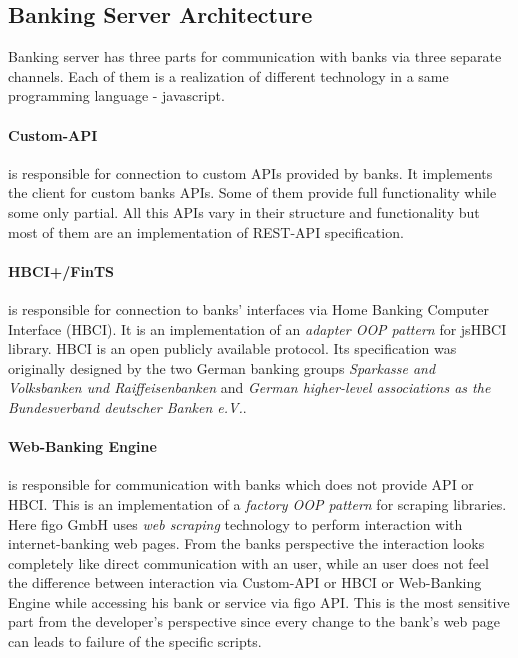 \subsection{Banking Server Architecture}
	Banking server has three parts for communication with banks via three separate channels. Each of them is a realization of different technology in a same programming language - javascript.  

	\paragraph{Custom-API} is responsible for connection to custom APIs provided by banks. It implements the client for custom banks APIs. Some of them provide full functionality while some only partial. All this APIs vary in their structure and functionality but most of them  are an implementation of REST-API specification.
	
	\paragraph{HBCI+/FinTS} is responsible for connection to banks' interfaces via Home Banking Computer Interface (HBCI). It is an implementation of an \textit{adapter OOP pattern} for jsHBCI library.  HBCI is an open publicly available protocol. Its specification was originally designed by the two German banking groups \textit{Sparkasse and Volksbanken und Raiffeisenbanken} and \textit{German higher-level associations as the Bundesverband deutscher Banken e.V.}.  \cite{finTS}
	
	\paragraph{Web-Banking Engine} is responsible for communication with banks which does not provide API or HBCI. This is an implementation of a \textit{factory OOP pattern} for scraping libraries. Here figo GmbH uses \textit{web scraping} technology to perform interaction with internet-banking web pages.
	From the banks perspective the interaction looks completely like direct communication with an user, while an user does not feel the difference between interaction via Custom-API or HBCI or Web-Banking Engine while accessing his bank or service via figo API.
	This is the most sensitive part from the developer's perspective since every change to the bank's web page can leads to failure of the specific scripts. \\
	
